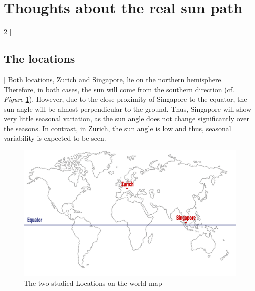 \documentclass[a4paper,9pt]{article}
\begin{document}
\newpage
\section{Thoughts about the real sun path}
\begin{multicols}{2}
[
\subsection{The locations}
]
Both locations, Zurich and Singapore, lie on the northern hemisphere. Therefore, in both cases, the sun will come from the southern direction (cf. \textit{Figure} \ref{Map}). However, due to the close proximity of Singapore to the equator, the sun angle will be almost perpendicular to the ground. Thus, Singapore will show very little seasonal variation, as the sun angle does not change significantly over the seasons. In contrast, in Zurich, the sun angle is low and thus, seasonal variability is expected to be seen.
 \begin{figure}[H]
        \centering
        \includegraphics[width=1\linewidth]{Images/Worldmapp_1.jpg}
        \caption{The two studied Locations on the world map}
        \label{Map}
    \end{figure}
\end{multicols}
\end{document}
